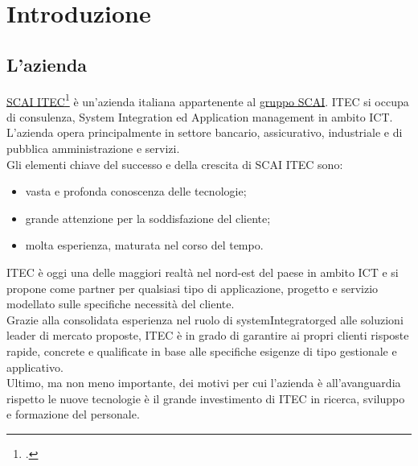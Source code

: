 
\chapter{Introduzione}
\label{cap:introduzione}





\section{L'azienda}

\href{https://scaiitec.it/}{SCAI ITEC\footcite{SCAI ITEC abbrev: ITEC} } è un'azienda italiana appartenente al \href{https://www.grupposcai.it/}{gruppo SCAI}. ITEC si occupa di consulenza, System Integration ed Application management in ambito ICT. L'azienda opera principalmente in settore bancario, assicurativo, industriale e di pubblica amministrazione e servizi. \\Gli elementi chiave del successo e della crescita di SCAI ITEC sono:
\begin{itemize}
    \item vasta e profonda conoscenza delle tecnologie;
    \item grande attenzione per la soddisfazione del cliente;
    \item molta esperienza, maturata nel corso del tempo.
\end{itemize} 
ITEC è oggi una delle maggiori realtà nel nord-est del paese in ambito ICT e si propone come partner per qualsiasi tipo di applicazione, progetto e servizio modellato sulle specifiche necessità del cliente. 
\\Grazie alla consolidata esperienza nel ruolo di \gls{systemIntegratorg}\glsfirstoccur ed alle soluzioni leader di mercato proposte, ITEC è in grado di garantire ai propri clienti risposte rapide, concrete e qualificate in base alle specifiche esigenze di tipo gestionale e applicativo.
\\Ultimo, ma non meno importante, dei motivi per cui l'azienda è all'avanguardia rispetto le nuove tecnologie è il grande investimento di ITEC in ricerca, sviluppo e formazione del personale.

